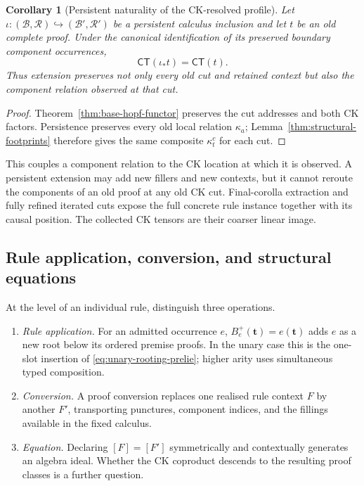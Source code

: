 \documentclass[10pt,a4paper]{article}
\theoremstyle{plain}
\newtheorem{corollary}[theorem]{Corollary}
\theoremstyle{definition}
\theoremstyle{remark}
\newcommand{\Base}{\mathcal B}
\newcommand{\Rules}{\mathcal R}
\begin{document}
\begin{corollary}[Persistent naturality of the CK-resolved profile]
\label{cor:component-profile-naturality}
Let
\(\iota:(\Base,\Rules)\hookrightarrow(\Base',\Rules')\)
be a persistent calculus inclusion and let \(t\) be an old complete
proof.  Under the canonical identification of its preserved boundary
component occurrences,
\[
                    \mathsf{CT}(\iota_*t)=\mathsf{CT}(t).
\]
Thus extension preserves not only every old cut and retained context but
also the component relation observed at that cut.
\end{corollary}

\begin{proof}
Theorem~\ref{thm:base-hopf-functor} preserves the cut addresses and both
CK factors.  Persistence preserves every old local relation
\(\kappa_a\); Lemma~\ref{thm:structural-footprints} therefore gives the
same composite \(\kappa_t^c\) for each cut.
\end{proof}

This couples a component relation to the CK location at which it is
observed.  A persistent extension may add new fillers and new contexts,
but it cannot reroute the components of an old proof at any old CK cut.
Final-corolla extraction and fully refined iterated cuts expose the full
concrete rule instance together with its causal position.  The collected CK
tensors are their coarser linear image.

\subsection{Rule application, conversion, and structural equations}

At the level of an individual rule, distinguish three operations.
\begin{enumerate}[label=(\roman*)]
\item \emph{Rule application.}  For an admitted occurrence \(e\),
\(B_e^+(\mathbf t)=e(\mathbf t)\) adds \(e\) as a new root below its
ordered premise proofs.  In the unary case this is the one-slot insertion
of \eqref{eq:unary-rooting-prelie}; higher arity uses simultaneous typed
composition.
\item \emph{Conversion.}  A proof conversion replaces one realised rule
context \(F\) by another \(F'\), transporting punctures, component indices,
and the fillings available in the fixed calculus.
\item \emph{Equation.}  Declaring \([F]=[F']\) symmetrically and
contextually generates an algebra ideal.  Whether the CK coproduct descends
to the resulting proof classes is a further question.
\end{enumerate}
\end{document}
